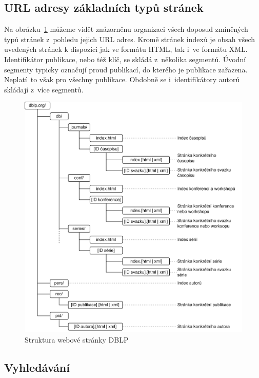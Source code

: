 \documentclass[
  biblatex,
  sourcecodes,
  glossaries,
  index
]{kidiplom}
\begin{document}
\subsection{URL adresy základních typů stránek}

Na obrázku~\ref{fig:struktura_url_adres_dblp} můžeme vidět znázorněnu organizaci všech doposud zmíněných typů stránek z~pohledu jejich URL adres. Kromě stránek indexů je obsah všech uvedených stránek k dispozici jak ve formátu HTML, tak i~ve formátu XML. Identifikátor publikace, nebo též klíč, se skládá z~několika segmentů. Úvodní segmenty typicky označují proud publikací, do kterého je publikace zařazena. Neplatí~to však pro všechny publikace. Obdobně se i~identifikátory autorů skládají z~více segmentů.

\begin{figure}[H]
\begin{center}
\includegraphics[width=\textwidth]{dblp_urls}
\caption{Struktura webové stránky DBLP}\label{fig:struktura_url_adres_dblp}
\end{center}
\end{figure}

\subsection{Vyhledávání}
\end{document}
